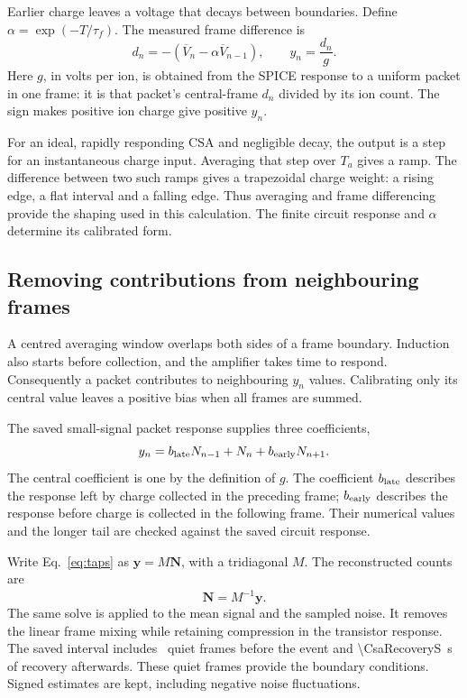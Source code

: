 \documentclass[11pt,a4paper]{article}
\begin{document}
Earlier charge leaves a voltage that decays between boundaries. Define
$\alpha=\exp(-T/\tau_f)$. The measured frame difference is
\begin{equation}
 d_n=-(\overline V_n-\alpha\overline V_{n-1}),\qquad
 y_n=\frac{d_n}{g}.
 \label{eq:scalar}
\end{equation}
Here $g$, in volts per ion, is obtained from the SPICE response to a uniform
packet in one frame: it is that packet's central-frame $d_n$ divided by its
ion count. The sign makes positive ion charge give positive $y_n$.

For an ideal, rapidly responding CSA and negligible decay, the output is a
step for an instantaneous charge input. Averaging that step over $T_a$ gives
a ramp. The difference between two such ramps gives a trapezoidal charge
weight: a rising edge, a flat interval and a falling edge. Thus averaging and
frame differencing provide the shaping used in this calculation. The finite
circuit response and $\alpha$ determine its calibrated form.

\subsection{Removing contributions from neighbouring frames}

A centred averaging window overlaps both sides of a frame boundary. Induction
also starts before collection, and the amplifier takes time to respond.
Consequently a packet contributes to neighbouring $y_n$ values. Calibrating
only its central value leaves a positive bias when all frames are summed.

The saved small-signal packet response supplies three coefficients,
\begin{equation}
 y_n=b_{\rm late}N_{n-1}+N_n+b_{\rm early}N_{n+1}.
 \label{eq:taps}
\end{equation}
The central coefficient is one by the definition of $g$.
The coefficient $b_{\rm late}$ describes the response left by charge collected
in the preceding frame; $b_{\rm early}$ describes the response before charge
is collected in the following frame. Their numerical values and the longer
tail are checked against the saved circuit response.

Write Eq.~\eqref{eq:taps} as $\mathbf y=M\mathbf N$, with a tridiagonal $M$.
The reconstructed counts are
\begin{equation}
 \widehat{\mathbf N}=M^{-1}\mathbf y.
 \label{eq:inverse}
\end{equation}
The same solve is applied to the mean signal and the sampled noise. It removes
the linear frame mixing while retaining compression in the transistor
response. The saved interval includes \CsaQuietFrames\ quiet frames before the event
and \SI{\CsaRecoveryS}{s} of recovery afterwards. These quiet frames provide the
boundary conditions. Signed estimates are kept, including negative noise fluctuations.
\end{document}
